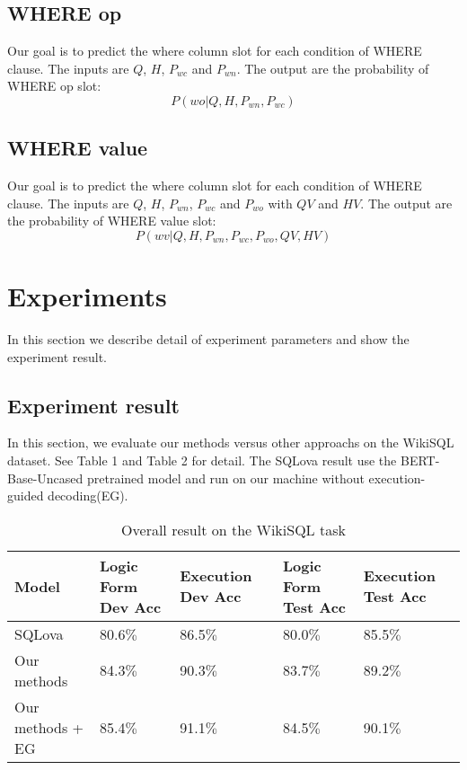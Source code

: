 \documentclass{llncs}
\begin{document}
\subsection{WHERE op}

Our goal is to predict the where column slot for each condition of WHERE clause. The inputs are $Q$, $H$, $P_{wc}$ and $P_{wn}$. The output are the probability of WHERE op slot:
\begin{equation}
P(wo|Q,H,P_{wn},P_{wc}) 
\end{equation}

\subsection{WHERE value}
Our goal is to predict the where column slot for each condition of WHERE clause. The inputs are $Q$, $H$, $P_{wn}$, $P_{wc}$ and $P_{wo}$ with $QV$ and $HV$. The output are the probability of WHERE value slot:
\begin{equation}
P(wv|Q,H,P_{wn},P_{wc},P_{wo},QV,HV) 
\end{equation}


\section{Experiments}

In this section we describe detail of experiment parameters and show the experiment result.

\subsection{Experiment result}

In this section, we evaluate our methods versus other approachs on the WikiSQL dataset. See Table 1 and Table 2 for detail. The SQLova\cite{ref_proc3} result use the BERT-Base-Uncased pretrained model and run on our machine without execution-guided decoding(EG)\cite{ref_proc6}.


\begin{table}
\caption{Overall result on the WikiSQL task}\label{tab1}
\centering
\begin{tabular}{|l|l|l|l|l|}
\hline
Model & Logic Form Dev Acc & Execution Dev Acc & Logic Form Test Acc & Execution Test Acc\\
\hline
SQLova\cite{ref_proc3} & 80.6$\%$ & 86.5$\%$ & 80.0$\%$ & 85.5$\%$ \\ 
\hline
Our methods & 84.3$\%$ & 90.3$\%$ & 83.7$\%$ & 89.2$\%$ \\ 
\hline
Our methods + EG & 85.4$\%$ & 91.1$\%$ & 84.5$\%$ & 90.1$\%$ \\ 
\hline
\end{tabular}
\end{table}
\end{document}
